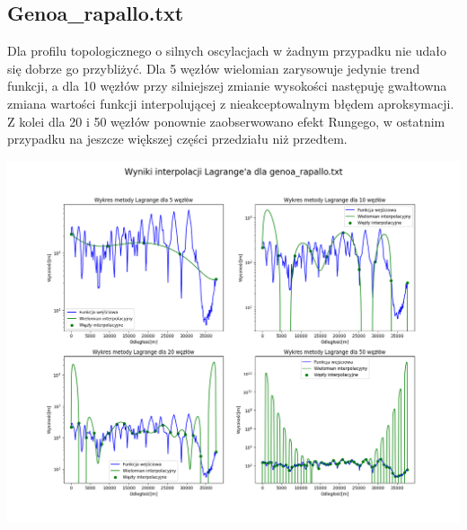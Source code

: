 \documentclass[a4paper,12pt]{article}
\begin{document}
   	\subsection{Genoa\_rapallo.txt}
	Dla profilu topologicznego o silnych oscylacjach w żadnym przypadku nie udało się dobrze go przybliżyć. Dla 5 węzłów wielomian zarysowuje jedynie trend funkcji, a dla 10 węzłów przy silniejszej zmianie wysokości następuję gwałtowna zmiana wartości funkcji interpolującej z nieakceptowalnym błędem aproksymacji. Z kolei dla 20 i 50 węzłów ponownie zaobserwowano efekt Rungego, w ostatnim przypadku na jeszcze większej części przedziału niż przedtem.
	\begin{center}
        \includegraphics[scale=0.4]{../charts/lagrange_genoa_rapallo.png}
    \end{center}
    
    \newpage
\end{document}
